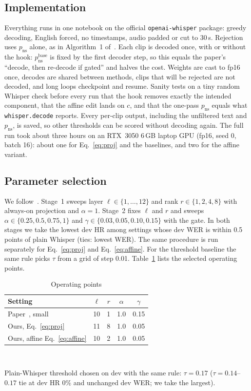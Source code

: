 \documentclass[conference,a4paper]{IEEEtran}
\newcommand{\pns}{p_{\mathrm{ns}}}
\newcommand{\pnsbase}{p_{\mathrm{ns}}^{\mathrm{base}}}
\begin{document}
\subsection{Implementation}
Everything runs in one notebook on the official \texttt{openai-whisper} package: greedy decoding, English forced, no timestamps, audio padded or cut to 30\,s. Rejection uses $\pns$ alone, as in Algorithm~1 of~\cite{abbasi2026hsp}. Each clip is decoded once, with or without the hook: $\pnsbase$ is fixed by the first decoder step, so this equals the paper's ``decode, then re-decode if gated'' and halves the cost. Weights are cast to fp16 once, decodes are shared between methods, clips that will be rejected are not decoded, and long loops checkpoint and resume. Sanity tests on a tiny random Whisper check before every run that the hook removes exactly the intended component, that the affine edit lands on $c$, and that the one-pass $\pns$ equals what \texttt{whisper.decode} reports. Every per-clip output, including the unfiltered text and $\pns$, is saved, so other thresholds can be scored without decoding again. The full run took about three hours on an RTX~3050 6\,GB laptop GPU (fp16, seed 0, batch 16): about one for Eq.~\eqref{eq:proj} and the baselines, and two for the affine variant.

\subsection{Parameter selection}
We follow~\cite[Sec.~5.1]{abbasi2026hsp}. Stage~1 sweeps layer $\ell \in \{1,\dots,12\}$ and rank $r \in \{1,2,4,8\}$ with always-on projection and $\alpha = 1$. Stage~2 fixes $\ell$ and $r$ and sweeps $\alpha \in \{0.25, 0.5, 0.75, 1\}$ and $\gamma \in \{0.03, 0.05, 0.10, 0.15\}$ with the gate. In both stages we take the lowest dev HR among settings whose dev WER is within 0.5 points of plain Whisper (ties: lowest WER). The same procedure is run separately for Eq.~\eqref{eq:proj} and Eq.~\eqref{eq:affine}. For the threshold baseline the same rule picks $\tau$ from a grid of step 0.01. Table~\ref{tab:op} lists the selected operating points.

\begin{table}[!t]
\centering
\caption{Operating points}
\label{tab:op}
\begin{tabular}{@{}lcccc@{}}
\toprule
Setting & $\ell$ & $r$ & $\alpha$ & $\gamma$ \\
\midrule
Paper~\cite{abbasi2026hsp}, small & 10 & 1 & 1.0 & 0.15 \\
Ours, Eq.~\eqref{eq:proj} & 11 & 8 & 1.0 & 0.05 \\
Ours, affine Eq.~\eqref{eq:affine} & 10 & 2 & 1.0 & 0.05 \\
\bottomrule
\end{tabular}\\[3pt]
\parbox{0.95\columnwidth}{\footnotesize Plain-Whisper threshold chosen on dev with the same rule: $\tau = 0.17$ ($\tau = 0.14$--$0.17$ tie at dev HR 0\% and unchanged dev WER; we take the largest).}
\end{table}
\end{document}
